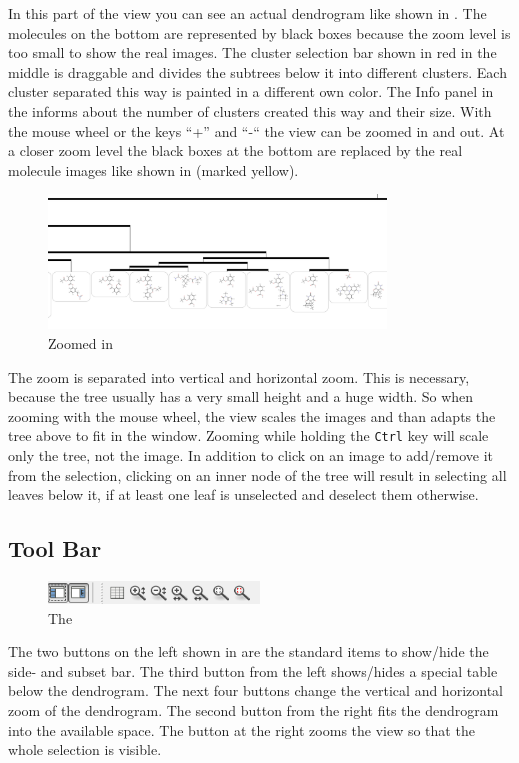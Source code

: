 In this part of the view you can see an actual dendrogram like shown in .
The molecules on the bottom are represented by black boxes because the zoom level is too small to show the real images.
The cluster selection bar shown in red in the middle is draggable and divides the subtrees below it into different clusters.
Each cluster separated this way is painted in a different own color.
The Info panel in the \sbar informs about the number of clusters created this way and their size.
With the mouse wheel or the keys “+” and “-“ the view can be zoomed in and out.
At a closer zoom level the black boxes at the bottom are replaced by the real molecule images like shown in  (marked yellow). 

\begin{figure}[!htb]
\centering
\includegraphics[width=0.8\textwidth]{images/dendrogram/zoomin}
\caption{Zoomed in}
\label{fig:dendrogram_zoom}
\end{figure} 

The zoom is separated into vertical and horizontal zoom.
This is necessary, because the tree usually has a very small height and a huge width.
So when zooming with the mouse wheel, the view scales the images and than adapts the tree above to fit in the window.
Zooming while holding the \texttt{Ctrl} key will scale only the tree, not the image. 
In addition to click on an image to add/remove it from the selection,
clicking on an inner node of the tree will result in selecting all leaves below it,
if at least one leaf is unselected and deselect them otherwise.


\subsection{Tool Bar}
 \begin{figure}[!htb]
\centering
\includegraphics[width=0.5\textwidth]{images/dendrogram/toolbar}
\caption{The \tbar}
\label{fig:dendrogram_tool}
\end{figure} 
The two buttons on the left shown in  are the standard items to show/hide the side- and subset bar.
The third button  from the left shows/hides a special table below the dendrogram.
The next four buttons change the vertical and horizontal zoom of the dendrogram.
The second button from the right fits the dendrogram into the available space.
The button at the right zooms the view so that the whole selection is visible.


